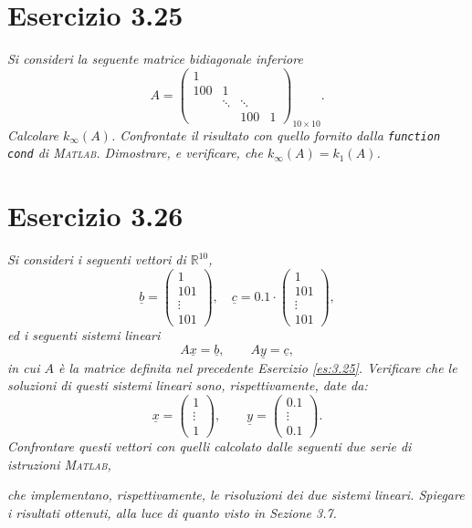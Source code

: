 \section{Esercizio 3.25}
\emph{Si consideri la seguente matrice \textit{bidiagonale inferiore}}
\[
  A=
  \begin{pmatrix}
    1 & & &\\
    100 & 1 & &\\
    & \ddots & \ddots &\\
    & & 100 & 1
  \end{pmatrix}_{10\times 10}.
\]
\emph{Calcolare $k_{\infty}(A)$. Confrontate il risultato con quello fornito dalla \lstinline{function cond} di \textsc{Matlab}. Dimostrare, e verificare, che $k_{\infty}(A)=k_1(A)$.}
\section{Esercizio 3.26}
\emph{Si consideri i seguenti vettori di $\mathbb{R}^{10}$,}
\[
  \underline{b}=
  \begin{pmatrix}
    1\\
    101\\
    \vdots\\
    101
  \end{pmatrix},
  \quad \underline{c}=0.1\cdot
  \begin{pmatrix}
    1\\
    101\\
    \vdots\\
    101
  \end{pmatrix},
\]
\emph{ed i seguenti sistemi lineari
$$A\underline{x}=\underline{b},\qquad A\underline{y}=\underline{c},$$
in cui $A$ è la matrice definita nel precedente Esercizio \ref{es:3.25}. Verificare che le soluzioni di questi sistemi lineari sono, rispettivamente, date da:}
\[
  \underline{x}=
  \begin{pmatrix}
    1\\
    \vdots\\
    1
  \end{pmatrix},
  \qquad \underline{y}=
  \begin{pmatrix}
    0.1\\
    \vdots\\
    0.1
  \end{pmatrix}.
\]
\emph{Confrontare questi vettori con quelli calcolato dalle seguenti due serie di istruzioni \textsc{Matlab},}

\emph{che implementano, rispettivamente, le risoluzioni dei due sistemi lineari. Spiegare i risultati ottenuti, alla luce di quanto visto in Sezione 3.7.}

